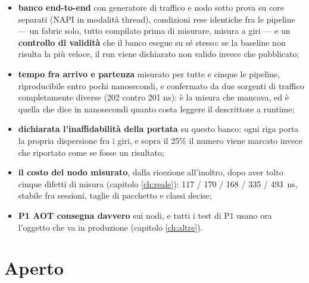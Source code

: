 \documentclass[11pt,a4paper,oneside]{report}
\begin{document}
\begin{itemize}
\item \textbf{banco end-to-end} con generatore di traffico e nodo sotto prova su
      core separati (NAPI in modalità thread), condizioni rese identiche fra le
      pipeline --- un fabric solo, tutto compilato prima di misurare, misura a
      giri --- e un \textbf{controllo di validità} che il banco esegue su sé
      stesso: se la baseline non risulta la più veloce, il run viene dichiarato
      non valido invece che pubblicato;
\item \textbf{tempo fra arrivo e partenza} misurato per tutte e cinque le
      pipeline, riproducibile entro pochi nanosecondi, e confermato da due
      sorgenti di traffico completamente diverse (202 contro 201 ns): è la
      misura che mancava, ed è quella che dice in nanosecondi quanto costa
      leggere il descrittore a runtime;
\item \textbf{dichiarata l'inaffidabilità della portata} su questo banco: ogni
      riga porta la propria dispersione fra i giri, e sopra il 25\% il numero
      viene marcato invece che riportato come se fosse un risultato;
\item \textbf{il costo del nodo misurato}, dalla ricezione all'inoltro, dopo aver
      tolto cinque difetti di misura (capitolo \ref{ch:reale}): 117 / 170 / 168 /
      335 / 493~ns, stabile fra sessioni, taglie di pacchetto e classi decise;
\item \textbf{P1 AOT consegna davvero} sui nodi, e tutti i test di P1 usano ora
      l'oggetto che va in produzione (capitolo \ref{ch:altre}).
\end{itemize}

\section{Aperto}
\end{document}
